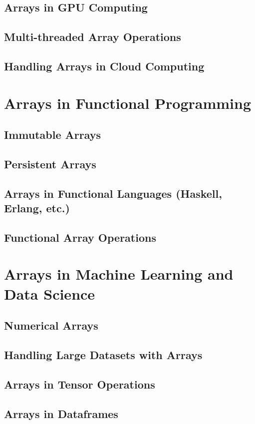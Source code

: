\documentclass[12pt, oneside]{book}
\begin{document}
\section{Arrays in GPU Computing}
\section{Multi-threaded Array Operations}
\section{Handling Arrays in Cloud Computing}

\chapter{Arrays in Functional Programming}
\section{Immutable Arrays}
\section{Persistent Arrays}
\section{Arrays in Functional Languages (Haskell, Erlang, etc.)}
\section{Functional Array Operations}
	
\chapter{Arrays in Machine Learning and Data Science}
\section{Numerical Arrays}
\section{Handling Large Datasets with Arrays}
\section{Arrays in Tensor Operations}
\section{Arrays in Dataframes}
\end{document}
